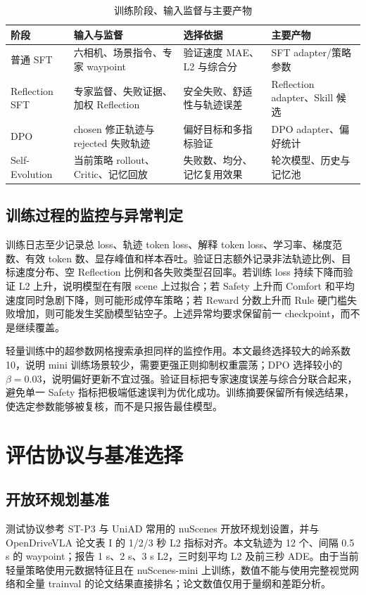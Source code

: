\documentclass[UTF8,a4paper,12pt,fontset=fandol]{ctexart}
\begin{document}
\begin{table}[!htbp]
\centering\small
\caption{训练阶段、输入监督与主要产物}
\begin{tabular}{P{0.16\textwidth}P{0.27\textwidth}P{0.27\textwidth}P{0.17\textwidth}}
\toprule
阶段 & 输入与监督 & 选择依据 & 主要产物 \\
\midrule
普通 SFT & 六相机、场景指令、专家 waypoint & 验证速度 MAE、L2 与综合分 & SFT adapter/策略参数 \\
Reflection SFT & 专家监督、失败证据、加权 Reflection & 安全失败、舒适性与轨迹误差 & Reflection adapter、Skill 候选 \\
DPO & chosen 修正轨迹与 rejected 失败轨迹 & 偏好目标和多指标验证 & DPO adapter、偏好统计 \\
Self-Evolution & 当前策略 rollout、Critic、记忆回放 & 失败数、均分、记忆复用效果 & 轮次模型、历史与记忆池 \\
\bottomrule
\end{tabular}
\end{table}

\subsection{训练过程的监控与异常判定}
训练日志至少记录总 loss、轨迹 token loss、解释 token loss、学习率、梯度范数、有效 token 数、显存峰值和样本吞吐。验证日志额外记录非法轨迹比例、目标速度分布、空 Reflection 比例和各失败类型召回率。若训练 loss 持续下降而验证 L2 上升，说明模型在有限 scene 上过拟合；若 Safety 上升而 Comfort 和平均速度同时急剧下降，则可能形成停车策略；若 Reward 分数上升而 Rule 硬门槛失败增加，则可能发生奖励模型钻空子。上述异常均要求保留前一 checkpoint，而不是继续覆盖。

轻量训练中的超参数网格搜索承担同样的监控作用。本文最终选择较大的岭系数 10，说明 mini 训练场景较少，需要更强正则抑制权重震荡；DPO 选择较小的 $\beta=0.03$，说明偏好更新不宜过强。验证目标把专家速度误差与综合分联合起来，避免单一 Safety 指标把极端低速误判为优化成功。训练摘要保留所有候选结果，使选定参数能够被复核，而不是只报告最佳模型。

\section{评估协议与基准选择}
\subsection{开放环规划基准}
测试协议参考 ST-P3 与 UniAD 常用的 nuScenes 开放环规划设置，并与 OpenDriveVLA 论文表 I 的 1/2/3 秒 L2 指标对齐。本文轨迹为 12 个、间隔 0.5 s 的 waypoint；报告 1 s、2 s、3 s L2，三时刻平均 L2 及前三秒 ADE。由于当前轻量策略使用元数据特征且在 nuScenes-mini 上训练，数值不能与使用完整视觉网络和全量 trainval 的论文结果直接排名；论文数值仅用于量纲和差距分析。
\end{document}
